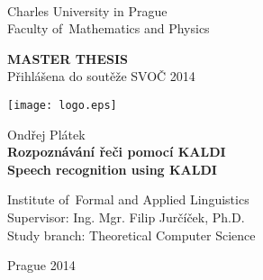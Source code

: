 
\begin{titlepage}
\begin{center}
\ \\

\vspace{15mm}

\large
Charles University in Prague\\
Faculty of~Mathematics and Physics\\

\vspace{5mm}

{\Large\bf MASTER THESIS} \\
Přihlášena do soutěže SVOČ 2014

\vspace{15mm}

\texttt{[image: logo.eps]} %

\vspace{20mm}
{\Large Ondřej Plátek}\\ 

\vspace{5mm}
{\Large\bf Rozpoznávání řeči pomocí KALDI} \\
\vspace{5mm}
{\bf Speech recognition using KALDI}

\vspace{20mm}
\large
\noindent
Institute of~Formal and Applied Linguistics\\
\noindent
Supervisor: Ing. Mgr. Filip Jurčíček, Ph.D.\\
\noindent
Study branch: Theoretical Computer Science\\
\end{center}
\vspace{20mm}
\begin{center}
Prague 2014
\end{center}

\end{titlepage} %


%
%

